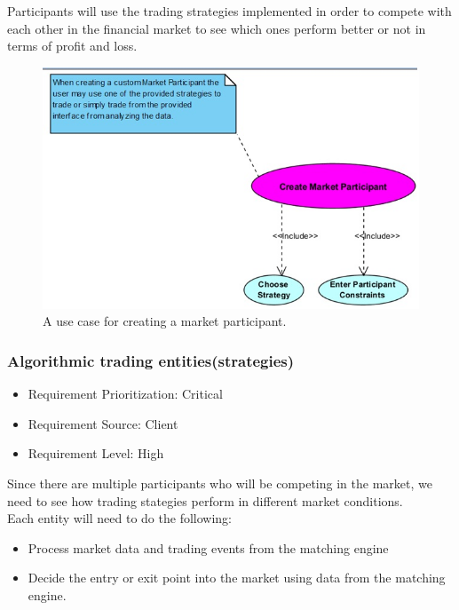 \documentclass[12pt]{article}
\begin{document}
				Participants will use the trading strategies implemented in order to compete with each other in the financial market to see which ones perform better or not in terms of profit and loss. 
				
				\begin{figure}[th]
								\centering
								\includegraphics[scale=0.6]{./USE_CASE_Create_Market_Participant_Financial_Market_Simulator}
								\caption{A use case for creating a market participant.}
								\label{domain objects}
				\end{figure}
				
				\subsubsection{Algorithmic trading entities(strategies)}
				\begin{itemize}
					\item Requirement Prioritization: Critical
					\item Requirement Source: Client 	
					\item Requirement Level: High
				\end{itemize}
				Since there are multiple participants who will be competing in the market, we need to see how trading stategies perform in different market conditions. \\
				
				Each entity will need to do the following:
				\begin{itemize}
						\item Process market data and trading events from the matching engine
						\item Decide the entry or exit point into the market using data from the matching engine.
				\end{itemize}
					
\end{document}
